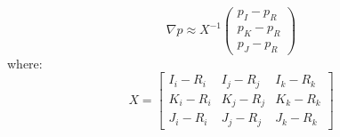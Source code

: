 \documentclass{article}
\begin{document}
	\begin{equation} \label{eq:e2}													
		\nabla p 
		\approx X^{-1}
			\begin{pmatrix}
				p_{I}- p_{R} \\ p_{K} - p_{R} \\ p_{J} - p_{R} 
			\end{pmatrix}
	\end{equation}
where:
	\begin{displaymath}	
	X =
	\begin{bmatrix}
	I_{i} - R_{i} & I_{j} - R_{j} & I_{k} - R_{k} \\
	K_{i} - R_{i} & K_{j} - R_{j} & K_{k} - R_{k} \\
	J_{i} - R_{i} & J_{j} - R_{j} & J_{k} - R_{k}
	\end{bmatrix}
	\end{displaymath}
\end{document}
